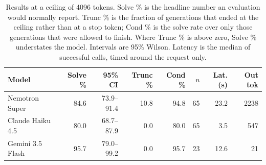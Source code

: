 \begin{table}[t]
\centering
\small
\begin{tabular}{lrrrrrrr}
\toprule
Model & Solve \% & 95\% CI & Trunc \% & Cond \% & $n$ & Lat.(s) & Out tok \\
\midrule
Nemotron Super & 84.6 & 73.9--91.4 & 10.8 & 94.8 & 65 & 23.2 & 2238 \\
Claude Haiku 4.5 & 80.0 & 68.7--87.9 & 0.0 & 80.0 & 65 & 3.5 & 547 \\
Gemini 3.5 Flash & 95.7 & 79.0--99.2 & 0.0 & 95.7 & 23 & 12.6 & 21 \\
\bottomrule
\end{tabular}
\caption{Results at a ceiling of 4096 tokens. Solve \% is the headline number an evaluation would normally report. Trunc \% is the fraction of generations that ended at the ceiling rather than at a stop token; Cond \% is the solve rate over only those generations that were allowed to finish. Where Trunc \% is above zero, Solve \% understates the model. Intervals are 95\% Wilson. Latency is the median of successful calls, timed around the request only.}
\label{tab:main}
\end{table}
